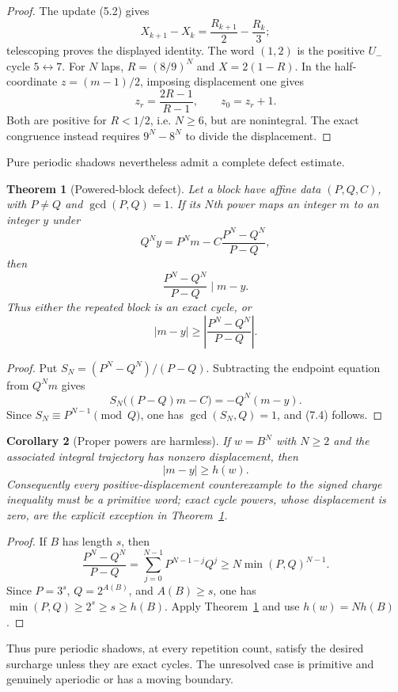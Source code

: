 \documentclass[11pt,reqno]{amsart}
\newtheorem{theorem}{Theorem}[section]
\newtheorem{corollary}[theorem]{Corollary}
\theoremstyle{remark}
\newcommand{\Um}{U_{-}}
\begin{document}
\begin{proof}
The update (5.2) gives
\[
 X_{k+1}-X_k=\frac{R_{k+1}}2-\frac{R_k}{3};
\]
telescoping proves the displayed identity.  The word $(1,2)$ is the positive $\Um$ cycle
$5\leftrightarrow7$.  For $N$ laps, $R=(8/9)^N$ and
$X=2(1-R)$.  In the half-coordinate $z=(m-1)/2$, imposing displacement one
gives
\[
 z_r=\frac{2R-1}{R-1},\qquad z_0=z_r+1.
\]
Both are positive for $R<1/2$, i.e. $N\ge6$, but are nonintegral.  The exact
congruence instead requires $9^N-8^N$ to divide the displacement.
\end{proof}

Pure periodic shadows nevertheless admit a complete defect estimate.

\begin{theorem}[Powered-block defect]\label{thm:powered}
Let a block have affine data $(P,Q,C)$, with $P\ne Q$ and
$\gcd(P,Q)=1$.  If its $N$th power maps an integer $m$ to an integer $y$
under
\[
 Q^Ny=P^Nm-C\frac{P^N-Q^N}{P-Q},
\]
then
\[
 \frac{P^N-Q^N}{P-Q}\mid m-y.                        \tag{7.4}
\]
Thus either the repeated block is an exact cycle, or
\[
 |m-y|\ge\left|\frac{P^N-Q^N}{P-Q}\right|.           \tag{7.5}
\]
\end{theorem}

\begin{proof}
Put $S_N=(P^N-Q^N)/(P-Q)$.  Subtracting the endpoint equation from
$Q^Nm$ gives
\[
 S_N\bigl((P-Q)m-C\bigr)=-Q^N(m-y).
\]
Since $S_N\equiv P^{N-1}\pmod Q$, one has $\gcd(S_N,Q)=1$, and (7.4)
follows.
\end{proof}

\begin{corollary}[Proper powers are harmless]\label{cor:primitive}
If $w=B^N$ with $N\ge2$ and the associated integral trajectory has nonzero
displacement, then
\[
 |m-y|\ge h(w).
\]
Consequently every positive-displacement counterexample to the signed charge
inequality must be a primitive word; exact cycle powers, whose displacement
is zero, are the explicit exception in Theorem~\ref{thm:powered}.
\end{corollary}

\begin{proof}
If $B$ has length $s$, then
\[
 \frac{P^N-Q^N}{P-Q}
 =\sum_{j=0}^{N-1}P^{N-1-j}Q^j
 \ge N\min(P,Q)^{N-1}.
\]
Since $P=3^s$, $Q=2^{A(B)}$, and $A(B)\ge s$, one has
$\min(P,Q)\ge2^s\ge s\ge h(B)$.  Apply
Theorem~\ref{thm:powered} and use $h(w)=Nh(B)$.
\end{proof}

Thus pure periodic shadows, at every repetition count, satisfy the desired
surcharge unless they are exact cycles.  The unresolved case is primitive
and genuinely aperiodic or has a moving boundary.
\end{document}

